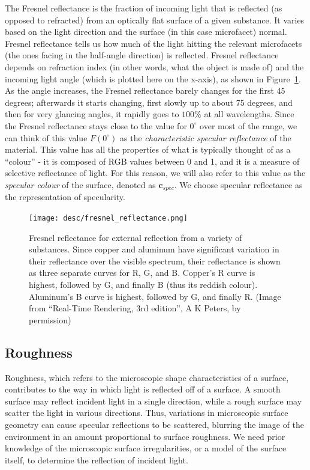 The Fresnel reflectance is the fraction of incoming light that is reflected (as opposed to refracted) from an optically flat surface of a given substance. It varies based on the light direction and the surface (in this case microfacet) normal. Fresnel reflectance tells us how much of the light hitting the relevant microfacets (the ones facing in the half-angle direction) is reflected. Fresnel reflectance depends on refraction index (in other words, what the object is made of) and the incoming light angle (which is plotted here on the x-axis), as shown in Figure~\ref{fig:fresnel_reflectance}. As the angle increases, the Fresnel reflectance barely changes for the first 45 degrees; afterwards it starts changing, first slowly up to about 75 degrees, and then for very glancing angles, it rapidly goes to $100\%$ at all wavelengths. Since the Fresnel reflectance stays close to the value for $0^\circ$ over most of the range, we can think of this value $F(0^\circ)$ as the \textit{characteristic specular reflectance} of the material. This value has all the properties of what is typically thought of as a ``colour'' - it is composed of RGB values between 0 and 1, and it is a measure of selective reflectance of light. For this reason, we will also refer to this value as the \textit{specular colour} of the surface, denoted as $\mathbf{c}_{spec}$. We choose specular reflectance as the representation of specularity.
\begin{figure}[!htbp]
\centering
\texttt{[image: desc/fresnel\_reflectance.png]}
\caption{Fresnel reflectance for external reflection from a variety of substances. Since copper and aluminum have significant variation in their reflectance over the visible spectrum, their reflectance is shown as three separate curves for R, G, and B. Copper's R curve is highest, followed by G, and finally B (thus its reddish colour). Aluminum's B curve is highest, followed by G, and finally R. (Image from “Real-Time Rendering, 3rd edition”,  A K Peters, by permission)}
\label{fig:fresnel_reflectance}
\end{figure}

\subsection{Roughness}
Roughness, which refers to the microscopic shape characteristics of a surface, contributes to the way in which light is reflected off of a surface. A smooth surface may reflect incident light in a single direction, while a rough surface may scatter the light in various directions. Thus, variations in microscopic surface geometry can cause specular reflections to be scattered, blurring the image of the environment in an amount proportional to surface roughness. We need prior knowledge of the microscopic surface irregularities, or a model of the surface itself, to determine the reflection of incident light.

